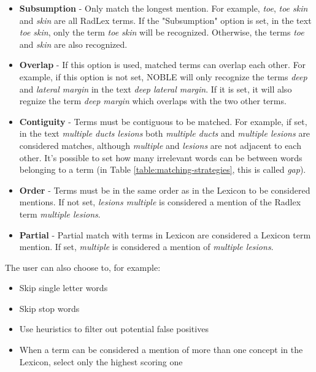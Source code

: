 \begin{itemize}

\item \textbf{Subsumption} - Only match the longest mention. For example, \textit{toe}, \textit{toe skin} and \textit{skin} are all RadLex terms. If the "Subsumption" option is set, in the text \textit{toe skin}, only the term \textit{toe skin} will be recognized. Otherwise, the terms \textit{toe} and \textit{skin} are also recognized.

\item \textbf{Overlap} - If this option is used, matched terms can overlap each other. For example, if this option is not set, NOBLE will only recognize the terms \textit{deep} and \textit{lateral margin} in the text \textit{deep lateral margin}. If it is set, it will also regnize the term \textit{deep margin} which overlaps with the two other terms.

\item \textbf{Contiguity} - Terms must be contiguous to be matched. For example, if set, in the text \textit{multiple ducts lesions} both \textit{multiple ducts} and \textit{multiple lesions} are considered matches, although \textit{multiple} and \textit{lesions} are not adjacent to each other. It's possible to set how many irrelevant words can be between words belonging to a term (in Table \ref{table:matching-strategies}, this is called \textit{gap}).

\item \textbf{Order} - Terms must be in the same order as in the Lexicon to be considered mentions. If not set, \textit{lesions multiple} is considered a mention of the Radlex term \textit{multiple lesions}.

\item \textbf{Partial} - Partial match with terms in Lexicon are considered a Lexicon term mention. If set, \textit{multiple} is considered a mention of \textit{multiple lesions}.

\end{itemize}

The user can also choose to, for example:

\begin{itemize}
\item Skip single letter words
\item Skip stop words
\item Use heuristics to filter out potential false positives
\item When a term can be considered a mention of more than one concept in the Lexicon,  select only the highest scoring one
\end{itemize}

